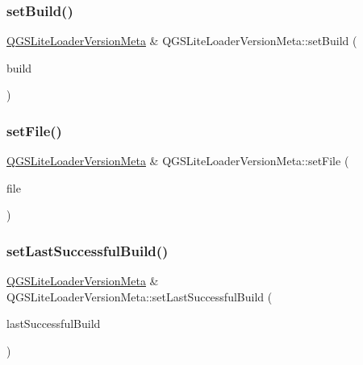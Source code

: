 \subsubsection{\texorpdfstring{set\+Build()}{setBuild()}}
{\footnotesize\ttfamily \mbox{\hyperlink{class_q_g_s_lite_loader_version_meta}{Q\+G\+S\+Lite\+Loader\+Version\+Meta}} \& Q\+G\+S\+Lite\+Loader\+Version\+Meta\+::set\+Build (\begin{DoxyParamCaption}\item[{const Q\+String \&}]{build }\end{DoxyParamCaption})}

\mbox{\label{class_q_g_s_lite_loader_version_meta_aaa34dfcced5617c669bfadd40abae31d}} 
\subsubsection{\texorpdfstring{set\+File()}{setFile()}}
{\footnotesize\ttfamily \mbox{\hyperlink{class_q_g_s_lite_loader_version_meta}{Q\+G\+S\+Lite\+Loader\+Version\+Meta}} \& Q\+G\+S\+Lite\+Loader\+Version\+Meta\+::set\+File (\begin{DoxyParamCaption}\item[{const Q\+String \&}]{file }\end{DoxyParamCaption})}

\mbox{\label{class_q_g_s_lite_loader_version_meta_ad9b0970016302dfee5598a309aa7962f}} 
\subsubsection{\texorpdfstring{set\+Last\+Successful\+Build()}{setLastSuccessfulBuild()}}
{\footnotesize\ttfamily \mbox{\hyperlink{class_q_g_s_lite_loader_version_meta}{Q\+G\+S\+Lite\+Loader\+Version\+Meta}} \& Q\+G\+S\+Lite\+Loader\+Version\+Meta\+::set\+Last\+Successful\+Build (\begin{DoxyParamCaption}\item[{const int}]{last\+Successful\+Build }\end{DoxyParamCaption})}

